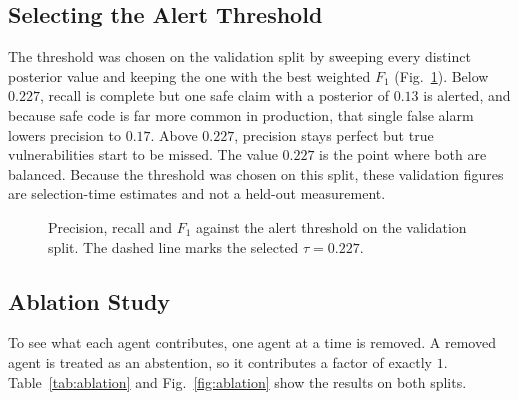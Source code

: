 \documentclass[conference]{IEEEtran}
\begin{document}
\subsection{Selecting the Alert Threshold}
The threshold was chosen on the validation split by sweeping every
distinct posterior value and keeping the one with the best weighted $F_1$
(Fig.~\ref{fig:threshold}). Below $0.227$, recall is complete but one safe
claim with a posterior of $0.13$ is alerted, and because safe code is far
more common in production, that single false alarm lowers precision to
$0.17$. Above $0.227$, precision stays perfect but true vulnerabilities
start to be missed. The value $0.227$ is the point where both are balanced.
Because the threshold was chosen on this split, these validation figures
are selection-time estimates and not a held-out measurement.

\begin{figure}[t]
\centering
{}
\caption{Precision, recall and $F_1$ against the alert threshold on the
validation split. The dashed line marks the selected $\tau=0.227$.}
\label{fig:threshold}
\end{figure}

\subsection{Ablation Study}
To see what each agent contributes, one agent at a time is removed. A
removed agent is treated as an abstention, so it contributes a factor of
exactly $1$. Table~\ref{tab:ablation} and Fig.~\ref{fig:ablation} show the
results on both splits.
\end{document}
